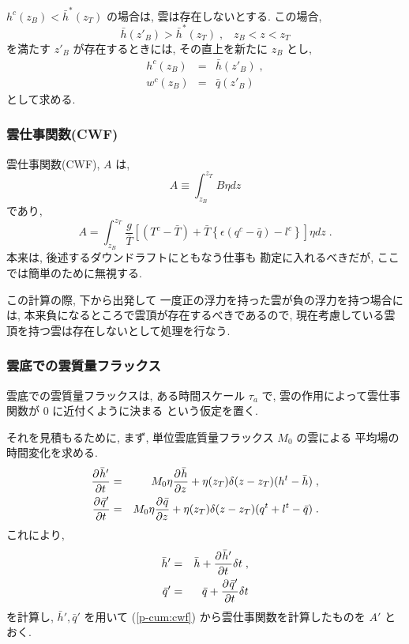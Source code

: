 $ h^c(z_B) < \bar{h}^* (z_T) $ の場合は,
雲は存在しないとする. この場合,
\begin{equation}
  \bar{h}(z'_B) > \bar{h}^* (z_T) \; , \;\;\; z_B < z < z_T 
\end{equation}
を満たす $z'_B$ が存在するときには,
その直上を新たに $z_B$ とし,
\begin{eqnarray}
  h^c(z_B) & = & \bar{h}(z'_B) \; , \\
  w^c(z_B) & = & \bar{q}(z'_B) \; 
\end{eqnarray}
として求める.

\subsubsection{雲仕事関数(CWF)}

雲仕事関数(CWF), $A$ は,
\begin{equation}
  A \equiv \int_{z_B}^{z_T} B \eta dz 
\end{equation}
であり,
\begin{equation}
A = \int_{z_B}^{z_T} \frac{g}{\bar{T}} \left[
        (T^c-\bar{T})
      + \bar{T} \left\{ \epsilon (q^c - \bar{q} ) 
                     - l^c                 \right\}
       \right] \eta dz \; .
       \label{p-cum:cwf}
\end{equation}
本来は, 後述するダウンドラフトにともなう仕事も
勘定に入れるべきだが, ここでは簡単のために無視する.

この計算の際, 下から出発して
一度正の浮力を持った雲が負の浮力を持つ場合には,
本来負になるところで雲頂が存在するべきであるので,
現在考慮している雲頂を持つ雲は存在しないとして処理を行なう.

\subsubsection{雲底での雲質量フラックス}

雲底での雲質量フラックスは,
ある時間スケール $\tau_a$ で,
雲の作用によって雲仕事関数が 0 に近付くように決まる
という仮定を置く.

それを見積もるために, まず, 単位雲底質量フラックス $M_0$ の雲による
平均場の時間変化を求める.
\begin{eqnarray}
  \DP{\bar{h}'}{t} & = & M_0 \eta \DP{\bar{h}}{z} 
                       + \eta(z_T) \delta(z-z_T) ( h^t - \bar{h} ) \; , \\
  \DP{\bar{q}'}{t} & = & M_0 \eta \DP{\bar{q}}{z} 
                       + \eta(z_T) \delta(z-z_T) ( q^t + l^t - \bar{q} ) \; .
\end{eqnarray}
これにより,
\begin{eqnarray}
  \bar{h}' & = & \bar{h} + \DP{\bar{h}'}{t} \delta t \; , \\
  \bar{q}' & = & \bar{q} + \DP{\bar{q}'}{t} \delta t 
\end{eqnarray}
を計算し, $\bar{h}', \bar{q}'$ を用いて
(\ref{p-cum:cwf}) から雲仕事関数を計算したものを $A'$ とおく.

